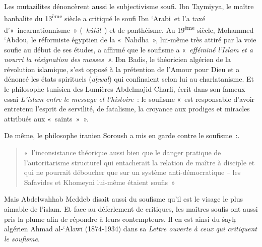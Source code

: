 Les mutazilites dénoncèrent aussi le subjectivisme soufi. Ibn Taymiyya,
le maître hanbalite du 13\textsuperscript{ème} siècle a critiqué le
soufi Ibn `Arabi~et l'a taxé d'«~incarnationnisme~» (~\emph{hûlûl}~) et
de panthéisme. Au 19\textsuperscript{ème} siècle, Mohammed `Abdou, le
réformiste égyptien de la «~Nahdha~», lui-même très attiré par la voie
soufie au début de ses études, a affirmé que le soufisme a
«~\emph{efféminé l'Islam et a nourri la résignation des masses~».} Ibn
Badis, le théoricien algérien de la révolution islamique, s'est opposé à
la prétention de l'Amour pour Dieu et a dénoncé les états spirituels
(\emph{aḥwal}) qui confinaient selon lui au charlatanisme. Et le
philosophe tunisien des Lumières Abdelmajid Charfi, écrit dans son
fameux essai \emph{L'islam entre le message et l'histoire}~: le soufisme
«~est responsable d'avoir entretenu l'esprit de servilité, de fatalisme,
la croyance aux prodiges et miracles attribués aux
«~saints~»~».

De même, le philosophe iranien Soroush a mis en garde contre le
soufisme~:.
\begin{quote}
    «~l'inconsistance théorique aussi bien que le danger pratique
de l'autoritarisme structurel qui entacherait la relation de maître à
disciple et qui ne pourrait déboucher que sur un système
anti-démocratique -- les Safavides et Khomeyni lui-même étaient
soufis~»
\end{quote}

Mais Abdelwahhab Meddeb disait aussi du soufisme qu'il est le visage le
plus aimable de l'islam. Et face au
déferlement de critiques, les maîtres soufis ont aussi pris la plume
afin de répondre à leurs contempteurs. Il en est ainsi du šayḫ algérien
Ahmad al-`Alawī (1874-1934) dans sa \emph{Lettre ouverte à ceux qui
critiquent le soufisme}.


